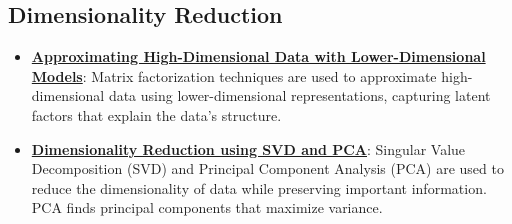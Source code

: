 \documentclass{article}%
\begin{document}
%
\subsection{Dimensionality Reduction}%
\label{subsec:DimensionalityReduction}%
\begin{itemize}[leftmargin=*]%
\item \href{https://purdue.brightspace.com/d2l/common/assets/pdfjs-d2l-dist/1.0.14-legacy/web/viewer.html?file=\%2Fcontent\%2Fenforced\%2F1095467-wl.202510.CS.24300.001\%2F11L2-svd-pca-recommender.pdf\%3Fou\%3D1095467\&lang=en-us\&container=d2l-fileviewer-rendered-pdf\&fullscreen=d2l-fileviewer-rendered-pdf-dialog\&height=667#page=3}{\textbf{Approximating High-Dimensional Data with Lower-Dimensional Models}}: Matrix factorization techniques are used to approximate high-dimensional data using lower-dimensional representations, capturing latent factors that explain the data's structure.%
\item \href{https://purdue.brightspace.com/d2l/common/assets/pdfjs-d2l-dist/1.0.14-legacy/web/viewer.html?file=\%2Fcontent\%2Fenforced\%2F1095467-wl.202510.CS.24300.001\%2F11L2-svd-pca-recommender.pdf\%3Fou\%3D1095467\&lang=en-us\&container=d2l-fileviewer-rendered-pdf\&fullscreen=d2l-fileviewer-rendered-pdf-dialog\&height=667#page=8}{\textbf{Dimensionality Reduction using SVD and PCA}}: Singular Value Decomposition (SVD) and Principal Component Analysis (PCA) are used to reduce the dimensionality of data while preserving important information. PCA finds principal components that maximize variance.%
\end{itemize}

%
\end{document}
